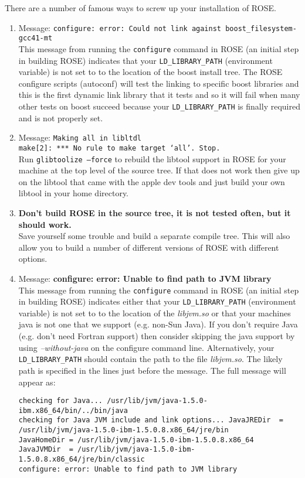    There are a number of famous ways to screw up your installation of ROSE.
\begin{enumerate}
   \item Message: {\tt configure: error: Could not link against boost\_filesystem-gcc41-mt} \\
   This message from running the {\tt configure} command in ROSE (an initial step in building
   ROSE) indicates that your {\tt LD\_LIBRARY\_PATH} (environment variable) is not set to 
   to the location of the boost install tree.  The ROSE configure scripts (autoconf) will
   test the linking to specific boost libraries and this is the first dynamic link library 
   that it tests and so it will fail when many other tests on boost succeed because your
   {\tt LD\_LIBRARY\_PATH} is finally required and is not properly set.

   \item Message: {\tt Making all in libltdl \\
      make[2]: *** No rule to make target `all'.  Stop.} \\
   Run {\tt glibtoolize --force} to rebuild the libtool support in ROSE for your machine 
   at the top level of the source tree. If that does not work then give up on the libtool 
   that came with the apple dev tools and just build your own libtool in your home directory.

   \item {\bf Don't build ROSE in the source tree, it is not tested often, but it should work.} \\
    Save yourself some trouble and build a separate compile tree.  This will also allow
    you to build a number of different versions of ROSE with different options.

    \item Message: {\bf configure: error: Unable to find path to JVM library} \\
   This message from running the {\tt configure} command in ROSE (an initial step in building
   ROSE) indicates either that your {\tt LD\_LIBRARY\_PATH} (environment variable) is not set to 
   to the location of the {\em libjvm.so} or that your machines java is not one that we
   support (e.g. non-Sun Java).  If you don't require Java (e.g. don't need Fortran
   support) then consider skipping the java support by using {\em --without-java} on the
   configure command line.
   Alternatively, your {\tt LD\_LIBRARY\_PATH} should contain the path to the file 
   {\em libjvm.so}.  The likely path is specified in the lines just before the message.  
   The full message will appear as:
\begin{verbatim}
checking for Java... /usr/lib/jvm/java-1.5.0-ibm.x86_64/bin/../bin/java
checking for Java JVM include and link options... JavaJREDir  = /usr/lib/jvm/java-1.5.0-ibm-1.5.0.8.x86_64/jre/bin
JavaHomeDir = /usr/lib/jvm/java-1.5.0-ibm-1.5.0.8.x86_64
JavaJVMDir  = /usr/lib/jvm/java-1.5.0-ibm-1.5.0.8.x86_64/jre/bin/classic
configure: error: Unable to find path to JVM library
\end{verbatim}


\end{enumerate}
